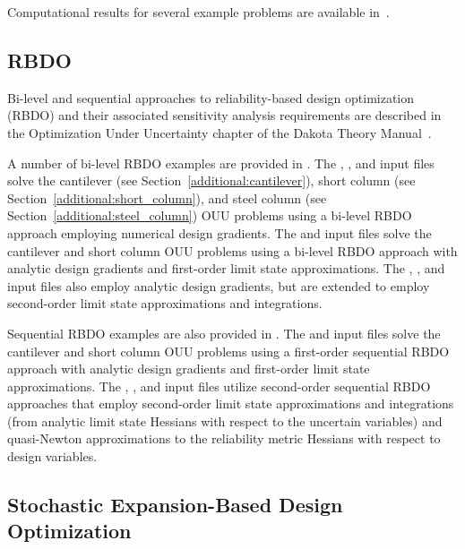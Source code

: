 Computational results for several example problems are available
in~\cite{Eld02}.

\subsection{RBDO} \label{adv_models:ouu:rbdo}

Bi-level and sequential approaches to reliability-based design
optimization (RBDO) and their associated sensitivity analysis
requirements are described in the Optimization Under Uncertainty
chapter of the Dakota Theory Manual~\cite{TheoMan}.

A number of bi-level RBDO examples are provided in .
The ,
, and
 input files solve the
cantilever (see Section~\ref{additional:cantilever}), short column
(see Section~\ref{additional:short_column}), and steel column (see
Section~\ref{additional:steel_column}) OUU problems using a bi-level
RBDO approach employing numerical design gradients. The 
 and
 input files solve
the cantilever and short column OUU problems using a bi-level RBDO
approach with analytic design gradients and first-order limit state
approximations. The ,
, and
 input files also
employ analytic design gradients, but are extended to employ
second-order limit state approximations and integrations.

Sequential RBDO examples are also provided in
.  The
 and
 input files solve the
cantilever and short column OUU problems using a first-order
sequential RBDO approach with analytic design gradients and
first-order limit state approximations. The
,
, and
 input files utilize
second-order sequential RBDO approaches that employ second-order limit
state approximations and integrations (from analytic limit state
Hessians with respect to the uncertain variables) and quasi-Newton
approximations to the reliability metric Hessians with respect to
design variables.

\subsection{Stochastic Expansion-Based Design Optimization} \label{adv_models:ouu:sebdo}

